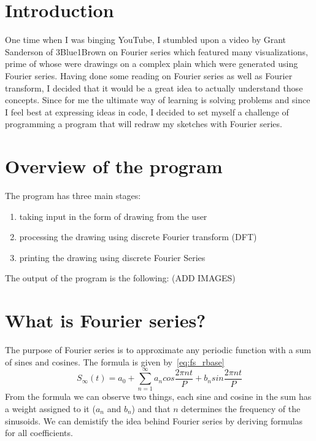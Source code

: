 \documentclass{article}
\begin{document}
\section{Introduction}

    One time when I was binging YouTube, I stumbled upon a video by Grant Sanderson
    of 3Blue1Brown on Fourier series which featured many visualizations, prime of
    whose were drawings on a complex plain which were generated using Fourier
    series. Having done some reading on Fourier series as well as Fourier transform, 
    I decided that it would be a great idea to actually understand those concepts.
    Since for me the ultimate way of learning is solving problems and since I feel
    best at expressing ideas in code, I decided to set myself a challenge of 
    programming a program that will redraw my sketches with Fourier series.

\section{Overview of the program}

    The program has three main stages: 
    \begin{enumerate}
        \item taking input in the form of drawing from the user 
        \item processing the drawing using discrete Fourier transform (DFT)
        \item printing the drawing using discrete Fourier Series
    \end{enumerate}
    
    The output of the program is the following: (ADD IMAGES)



\section{What is Fourier series?}

    The purpose of Fourier series is to approximate any periodic function with
    a sum of sines and cosines. The formula is given by~\eqref{eq:fs_rbase}
    \begin{equation} \label{eq:fs_rbase}
        S_\infty(t) = a_0 + \sum_{n=1}^{\infty}a_ncos\frac{2\pi nt}{P} + b_n%
            sin\frac{2\pi nt}{P}
    \end{equation}
    From the formula we can observe two things, each sine and cosine in the sum
    has a weight assigned to it ($a_n$ and $b_n$) and that $n$ determines the 
    frequency of the sinusoids. We can demistify the idea behind Fourier series
    by deriving formulas for all coefficients.
\end{document}
